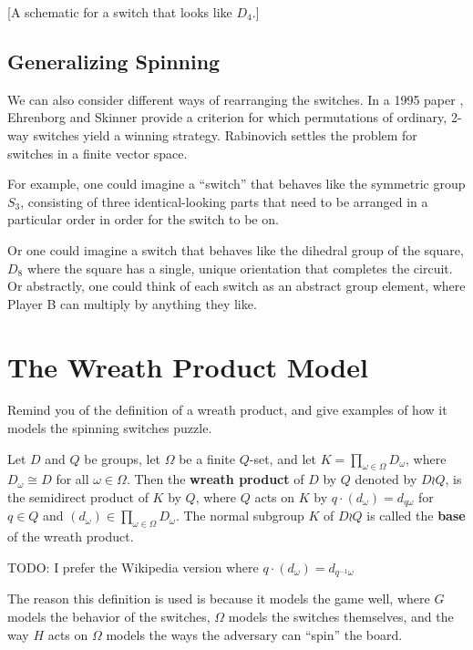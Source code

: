 [A schematic for a switch that looks like $D_4$.]


\subsection{Generalizing Spinning}
We can also consider different ways of rearranging the switches.
In a 1995 paper \cite{Ehrenborg1995}, Ehrenborg and Skinner provide a criterion
for which permutations of ordinary, 2-way switches yield a winning strategy.
Rabinovich \cite{Rabinovich2022} settles the problem for switches in a
finite vector space.

For example, one could imagine a ``switch'' that behaves like the symmetric
group $S_3$, consisting of three identical-looking parts that need to be
arranged in a particular order in order for the switch to be on.

Or one could imagine a switch that behaves like the dihedral group of the square,
$D_8$ where the square has a single, unique orientation that completes the circuit.
Or abstractly, one could think of each switch as an abstract group element,
where Player B can multiply by anything they like.

\section{The Wreath Product Model}
\label{sec:WreathModel}
Remind you of the definition of a wreath product, and give examples of how it
models the spinning switches puzzle.
\begin{definition}
  Let $D$ and $Q$ be groups,
  let $\Omega$ be a finite $Q$-set, and
  let $K = \prod_{\omega \in \Omega} D_\omega$, where $D_\omega \cong D$
  for all $\omega \in \Omega$.
  Then the \textbf{wreath product} of $D$ by $Q$ denoted by $D \wr Q$,
  is the semidirect product of $K$ by $Q$,
  where $Q$ acts on $K$ by $q \cdot (d_\omega) = d_{q\omega}$ for $q \in Q$ and
  $(d_\omega) \in \prod_{\omega \in \Omega} D_\omega$.
  The normal subgroup $K$ of $D \wr Q$ is called
  the \textbf{base} of the wreath product.
\end{definition}

TODO: I prefer the Wikipedia version where $q \cdot (d_\omega) = d_{q^{-1}\omega}$

The reason this definition is used is because it models the game well, where
$G$ models the behavior of the switches, $\Omega$ models the switches themselves,
and the way $H$ acts on $\Omega$ models the ways the adversary can ``spin'' the
board.

